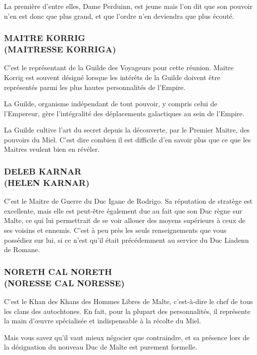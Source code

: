 \documentclass[14pt,twocolumn]{extarticle}
\begin{document}
La première d'entre elles, Dame Perduinn, est jeune mais l'on dit que son
pouvoir n'en est donc que plus grand, et que l'ordre n'en deviendra que plus
écouté.

\subsubsection{MAITRE KORRIG\\(MAITRESSE KORRIGA)}

C'est le représentant de la Guilde des Voyageurs pour cette réunion. Maitre
Korrig est souvent désigné lorsque les intérêts de la Guilde doivent être
représentés parmi les plus hautes personnalités de l'Empire.

La Guilde, organisme indépendant de tout pouvoir, y compris celui de
l'Empereur, gère l'intégralité des déplacements galactiques au sein de
l'Empire.

La Guilde cultive l'art du secret depuis la découverte, par le Premier Maitre,
des pouvoirs du Miel. C'est dire combien il est difficile d'en savoir plus que
ce que les Maitres veulent bien en révéler.

\subsubsection{DELEB KARNAR\\(HELEN KARNAR)}

C'est le Maitre de Guerre du Duc Igane de Rodrigo. Sa réputation de stratège
est excellente, mais elle est peut-être également due au fait que son Duc règne
sur Malte, ce qui lui permettrait de se voir allouer des moyens supérieurs à
ceux de ses voisins et ennemis.
C'est à peu près les seuls renseignements que vous possédiez sur lui, si ce
n'est qu'il était précédemment au service du Duc Liadenn de Romane.

\subsubsection{NORETH CAL NORETH\\(NORESSE CAL NORESSE)}

C'est le Khan des Khans des Hommes Libres de Malte, c'est-à-dire le chef de
tous les clans des autochtones. En fait, pour la plupart des personnalités, il
représente la main d'œuvre spécialisée et indispensable à la récolte du
Miel.

Mais vous savez qu'il vaut mieux négocier que contraindre, et sa présence lors
de la désignation du nouveau Duc de Malte est purement formelle.
\end{document}
